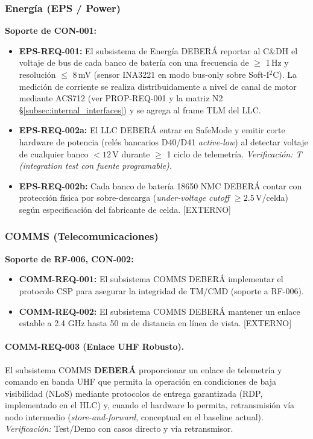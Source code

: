 \subsubsection{Energía (EPS / Power)}
\textbf{Soporte de CON-001:}
\begin{itemize}
    \item \textbf{EPS-REQ-001:} El subsistema de Energía DEBERÁ reportar al C\&DH el voltaje de bus de cada banco de batería con una frecuencia de $\ge$ 1\,Hz y resolución $\le$ 8\,mV (sensor INA3221 en modo bus-only sobre Soft-I$^2$C). La medición de corriente se realiza distribuidamente a nivel de canal de motor mediante ACS712 (ver PROP-REQ-001 y la matriz N2 \S\ref{subsec:internal_interfaces}) y se agrega al frame TLM del LLC.
    \item \textbf{EPS-REQ-002a:} El LLC DEBERÁ entrar en SafeMode y emitir corte hardware de potencia (relés bancarios D40/D41 \emph{active-low}) al detectar voltaje de cualquier banco $< 12\,$V durante $\ge$ 1 ciclo de telemetría. \emph{Verificación: T (integration test con fuente programable).}
    \item \textbf{EPS-REQ-002b:} Cada banco de batería 18650 NMC DEBERÁ contar con protección física por sobre-descarga (\emph{under-voltage cutoff} $\ge 2.5\,$V/celda) según especificación del fabricante de celda. [EXTERNO]
\end{itemize}

\subsubsection{COMMS (Telecomunicaciones)}
\textbf{Soporte de RF-006, CON-002:}
\begin{itemize}
    \item \textbf{COMM-REQ-001:} El subsistema COMMS DEBERÁ implementar el protocolo CSP para asegurar la integridad de TM/CMD (soporte a RF-006).
    \item \textbf{COMM-REQ-002:} El subsistema COMMS DEBERÁ mantener un enlace estable a 2.4 GHz hasta 50 m de distancia en línea de vista. [EXTERNO]
\end{itemize}

\paragraph{COMM-REQ-003 (Enlace UHF Robusto).}
El subsistema COMMS \textbf{DEBERÁ} proporcionar un enlace de telemetría y comando en banda UHF que permita la operación en condiciones de baja visibilidad (NLoS) mediante protocolos de entrega garantizada (RDP, implementado en el HLC) y, cuando el hardware lo permita, retransmisión vía nodo intermedio (\emph{store-and-forward}, conceptual en el baseline actual). \\
\textit{Verificación:} Test/Demo con casos directo y vía retransmisor.

